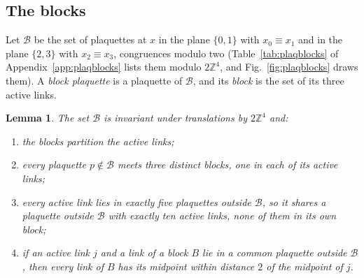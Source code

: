 \documentclass[aps,prd,twocolumn,superscriptaddress,nofootinbib,longbibliography,floatfix,amsmath,amssymb,10pt]{revtex4-2}
\newtheorem{lemma}[theorem]{Lemma}
\theoremstyle{definition}
\theoremstyle{remark}
\newcommand{\Z}{\mathbb{Z}}
\begin{document}
\subsection{The blocks}

Let $\mathcal B$ be the set of plaquettes at $x$ in the plane $\{0,1\}$ with
$x_0\equiv x_1$ and in the plane $\{2,3\}$ with $x_2\equiv x_3$, congruences
modulo two (Table~\ref{tab:plaqblocks} of Appendix~\ref{app:plaqblocks} lists
them modulo $2\Z^4$, and Fig.~\ref{fig:plaqblocks} draws them). A
\emph{block plaquette} is a plaquette of $\mathcal B$, and its \emph{block}
is the set of its three active links.

\begin{lemma}\label{lem:plaqblocks}
The set $\mathcal B$ is invariant under translations by $2\Z^4$ and:
\begin{enumerate}[label=\textup{(\roman*)},leftmargin=*]
\item the blocks partition the active links;
\item every plaquette $p\notin\mathcal B$ meets three distinct blocks, one in
each of its active links;
\item every active link lies in exactly five plaquettes outside $\mathcal B$,
so it shares a plaquette outside $\mathcal B$ with exactly ten active links,
none of them in its own block;
\item if an active link $j$ and a link of a block $B$ lie in a common
plaquette outside $\mathcal B$, then every link of $B$ has its midpoint
within distance $2$ of the midpoint of $j$.
\end{enumerate}
\end{lemma}
\end{document}
